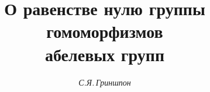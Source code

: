 

 




 


\newcommand{\la}{\langle} 


\newcommand{\ra}{\rangle} 


\newcommand{\Hom}{\operatorname{Hom}} 


\newcommand{\im}{\operatorname{Im}} 


\newcommand{\Ker}{\operatorname{Ker}} 


\newcommand{\tts}[1]{} 


 




  


\setcounter{page}{42} 












\author{\it С.Я.\,Гриншпон} 




\title{О равенстве нулю группы гомоморфизмов\\ 


абелевых групп} 


 


\date{} 




 


\pagestyle{plain} %


